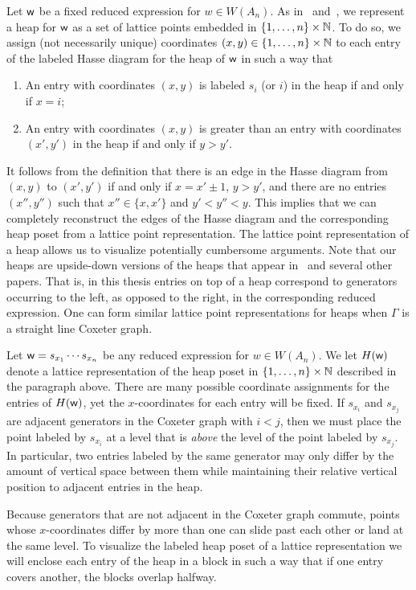     Let $\mathsf{w}$ be a fixed reduced expression for $w \in W(A_n)$. As in~\cite{Billey2007} and~\cite{Ernst2010}, we represent a heap for $\mathsf{w}$ as a set of lattice points embedded in $\{1,\ldots,n\} \times \mathbb{N}$.
    To do so, we assign (not necessarily unique) coordinates $(x,y) \in \{1,\ldots,n\} \times \mathbb{N}$ to each entry of the labeled Hasse diagram for the heap of $\mathsf{w}$ in such a way that
\begin{enumerate}[leftmargin=0.75in, label=(\alph*)]
    \item An entry with coordinates $(x,y)$ is labeled $s_i$ (or $i$) in the heap if and only if $x = i$; 
    \item An entry with coordinates $(x,y)$ is greater than an entry with coordinates $(x',y')$ in the heap if and only if $y > y'$.
\end{enumerate}
    It follows from the definition that there is an edge in the Hasse diagram from $(x,y)$ to $(x',y')$ if and only if $x = x' \pm 1$, $y > y'$, and there are no entries $(x'', y'')$ such that $x'' \in \{x, x'\}$ and $y'< y'' < y$.
    This implies that we can completely reconstruct the edges of the Hasse diagram and the corresponding heap poset from a lattice point representation.
    The lattice point representation of a heap allows us to visualize potentially cumbersome arguments. Note that our heaps are upside-down versions of the heaps that appear in~\cite{Billey2007} and several other papers. That is, in this thesis entries on top of a heap correspond to generators occurring to the left, as opposed to the right, in the corresponding reduced expression.
    One can form similar lattice point representations for heaps when $\Gamma$ is a straight line Coxeter graph.
    
    Let $\mathsf{w} = s_{x_1} \cdots s_{x_n}$ be any reduced expression for $w \in W(A_{n})$. We let $H(\mathsf{w})$ denote a lattice representation of the heap poset in $\{1,\ldots,n\} \times \mathbb{N}$ described in the paragraph above.
    There are many possible coordinate assignments for the entries of $H(\mathsf{w})$, yet the $x$-coordinates for each entry will be fixed. If $s_{x_i}$ and $s_{x_j}$ are adjacent generators in the Coxeter graph with $i<j$, then we must place the point labeled by $s_{x_i}$ at a level that is \emph{above} the level of the point labeled by $s_{x_j}$.
    In particular, two entries labeled by the same generator may only differ by the amount of vertical space between them while maintaining their relative vertical position to adjacent entries in the heap.
    
    Because generators that are not adjacent in the Coxeter graph commute, points whose $x$-coordinates differ by more than one can slide past each other or land at the same level.
    To visualize the labeled heap poset of a lattice representation we will enclose each entry of the heap in a block in such a way that if one entry covers another, the blocks overlap halfway.


